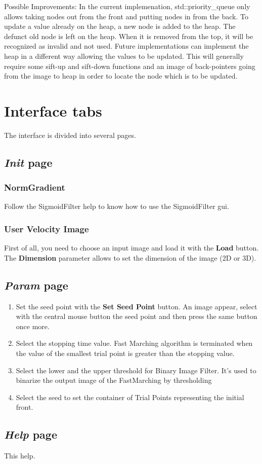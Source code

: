 \documentclass{article}
\begin{document}
Possible Improvements: In the current implemenation, std::priority\_queue only allows taking nodes out from the front and putting nodes in from the back. To update a value already on the heap, a new node is added to the heap. The defunct old node is left on the heap. When it is removed from the top, it will be recognized as invalid and not used. Future implementations can implement the heap in a different way allowing the values to be updated. This will generally require some sift-up and sift-down functions and an image of back-pointers going from the image to heap in order to locate the node which is to be updated.

\section{Interface tabs}

The interface is divided into several pages.

\subsection{\emph{Init} page}

\subsubsection{NormGradient}

Follow the SigmoidFilter help to know how to use the SigmoidFilter gui.

\subsubsection{User Velocity Image}

First of all, you need to choose an input image and load it with the {\bf Load} button.
The {\bf Dimension} parameter allows to set the dimension of the image (2D or 3D).

\subsection{\emph{Param} page}

\begin{enumerate}
  \item Set the seed point with the {\bf Set Seed Point} button. An image appear, select with the central mouse button the seed point and then press the same button once more.
  \item Select the stopping time value. Fast Marching algorithm is terminated when the value of the smallest trial point is greater than the stopping value.
  \item Select the lower and the upper threshold for Binary Image Filter. It's used to binarize the output image of the FastMarching by thresholding
  \item Select the seed to set the container of Trial Points representing the initial front.
\end{enumerate}


\subsection{\emph{Help} page}
This help.
\end{document}
